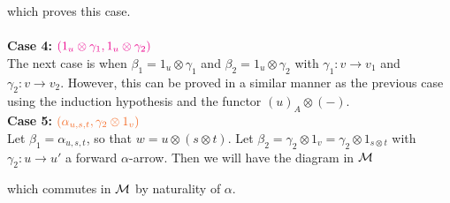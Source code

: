 \begin{prf}
\begin{center}
        \end{center}
        which proves this case.
        \\
        \\
        \textbf{Case 4:} $\textcolor{Magenta}{(1_u \otimes \gamma_1 ,1_u \otimes \gamma_2)}$\\
        The next case is when $\beta_1 = 1_u \otimes \gamma_1$ and $\beta_2 = 1_u\otimes\gamma_2$  
        with $\gamma_1: v \to v_1$ and $\gamma_2: v \to v_2$. However, this can be proved 
        in a similar manner as the previous case using 
        the induction hypothesis and the functor $(u)_A \otimes (-)$.
        \\
        \noindent\textbf{Case 5:} $\textcolor{Orange}{(\alpha_{u,s,t}, \gamma_2\otimes 1_v)}$\\
        Let $\beta_1 = \alpha_{u,s,t}$,  so that $w = u \otimes (s \otimes t)$. 
        Let $\beta_2 = \gamma_2 \otimes 1_{v}
        = \gamma_2 \otimes 1_{s\otimes t}$ 
        with $\gamma_2: u \to u'$
        a forward $\alpha$-arrow. Then we will have the diagram in $\mathcal{M}$
        \begin{center}
        \end{center}
        which commutes in $\mathcal{M}$ by naturality of $\alpha$. 
        \\

\end{prf}
